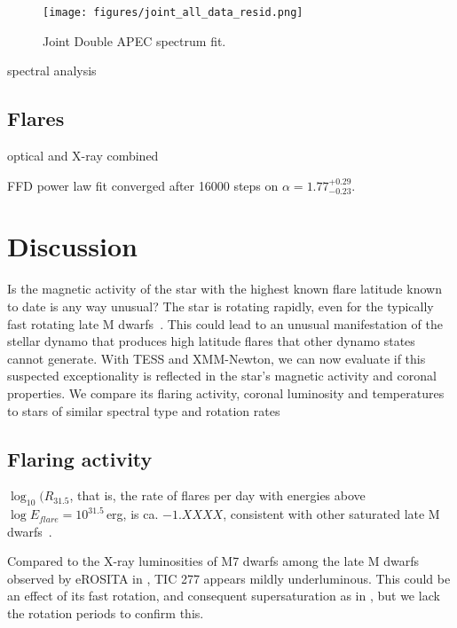 \documentclass[twocolumn]{aastex631}
\begin{document}
\begin{figure}
    \begin{centering}
        \texttt{[image: figures/joint\_all\_data\_resid.png]}
        \caption{
         Joint Double APEC spectrum fit.
        }
        \label{fig:spec_joint_all}
    \end{centering}
\end{figure}


spectral analysis



\subsection{Flares}

optical and X-ray combined

FFD power law fit converged after 16000 steps on $\alpha = 1.77_{-0.23}^{+0.29}$.


\section{Discussion}
\label{sec:discussion}

Is the magnetic activity of the star with the highest known flare latitude known to date is any way unusual? The star is rotating rapidly, even for the typically fast rotating late M dwarfs~\citep{medina2022galactic}. This could lead to an unusual manifestation of the stellar dynamo that produces high latitude flares that other dynamo states cannot generate. With TESS and XMM-Newton, we can now evaluate if this suspected exceptionality is reflected in the star's magnetic activity and coronal properties. We compare its flaring activity, coronal luminosity and temperatures to stars of similar spectral type and rotation rates

\subsection{Flaring activity}
\label{sec:discussion:flares}

$\log_10(R_{31.5}$, that is, the rate of flares per day with energies above $\log E_{flare}=10^{31.5}\,$erg, is ca. $-1.XXXX$, consistent with other saturated late M dwarfs~\citep{medina2022galactic}.

Compared to the X-ray luminosities of M7 dwarfs among the late M dwarfs observed by eROSITA in \citet{stelzer2022first}, TIC 277 appears mildly underluminous. This could be an effect of its fast rotation, and consequent supersaturation as in \citet{magaudda2022first}, but we lack the rotation periods to confirm this. 
\end{document}
